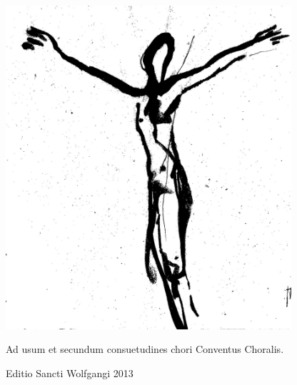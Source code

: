 \documentclass[a4paper, twoside, 12pt]{article}
\newcommand{\annusEditionis}{2013}
\begin{document}
\def\greinitialformat#1{%
{\fontsize{40}{40}\selectfont #1}%
}

\pagestyle{empty}

\setlength{\columnseprule}{1pt} %
\setlength{\columnsep}{20pt} %

\begin{titulusOfficii}
\end{titulusOfficii}


\vfill

\begin{center}
\includegraphics[height=12cm]{imagines/crux.jpg}
\end{center}

\vspace{3mm}

\begin{center}
Ad usum et secundum consuetudines chori \guillemotright Conventus Choralis\guillemotleft.

Editio Sancti Wolfgangi \annusEditionis
\end{center}
\end{document}

